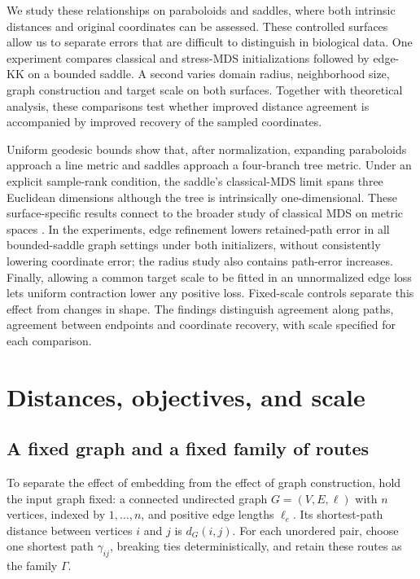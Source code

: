 \documentclass[11pt]{article}
\begin{document}
We study these relationships on paraboloids and saddles, where both intrinsic
distances and original coordinates can be assessed. These controlled surfaces
allow us to separate errors that are difficult to distinguish in biological
data. One experiment compares classical and stress-MDS initializations
followed by edge-KK on a bounded saddle. A second varies domain radius,
neighborhood size, graph construction and target scale on both surfaces.
Together with theoretical analysis, these comparisons test whether improved
distance agreement is accompanied by improved recovery of the sampled
coordinates.

Uniform geodesic bounds show that, after normalization, expanding paraboloids
approach a line metric and saddles approach a four-branch tree metric. Under
an explicit sample-rank condition, the saddle's classical-MDS limit spans
three Euclidean dimensions although the tree is intrinsically
one-dimensional. These surface-specific results connect to the broader study
of classical MDS on metric spaces \citep{lim2024}. In the experiments, edge
refinement lowers retained-path error in all \numBoundedGraphs{} bounded-saddle
graph settings under both initializers, without consistently lowering
coordinate error; the radius study also contains path-error increases.
Finally, allowing a common target scale to be fitted in an unnormalized edge
loss lets uniform contraction lower any positive loss. Fixed-scale controls
separate this effect from changes in shape. The findings distinguish
agreement along paths, agreement between endpoints and coordinate recovery,
with scale specified for each comparison.

\section{Distances, objectives, and scale}
\subsection{A fixed graph and a fixed family of routes}
To separate the effect of embedding from the effect of graph construction,
hold the input graph fixed: a connected undirected graph $G=(V,E,\ell)$ with
$n$ vertices, indexed by $1,\ldots,n$, and positive edge lengths $\ell_e$.
Its shortest-path distance between
vertices $i$ and $j$ is $d_G(i,j)$. For each unordered pair, choose one
shortest path $\gamma_{ij}$, breaking ties deterministically, and retain these
routes as the family $\Gamma$.
\end{document}
